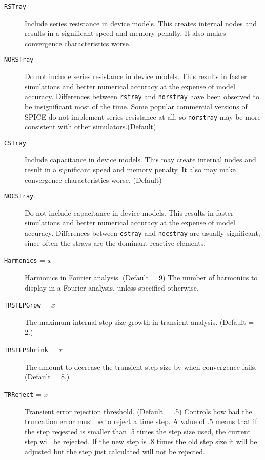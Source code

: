 \begin{description}
\item[{\tt RSTray}] Include series resistance in device models.  This 
creates internal nodes and results in a significant speed and memory 
penalty.  It also makes convergence characteristics worse.

\item[{\tt NORSTray}] Do not include series resistance in device
models.  This results in faster simulations and better numerical
accuracy at the expense of model accuracy.  Differences between
{\tt rstray} and {\tt norstray} have been observed to be insignificant
most of the time.  Some popular commercial versions of SPICE do
not implement series resistance at all, so {\tt norstray} may be
more consistent with other simulators.(Default)

\item[{\tt CSTray}] Include capacitance in device models.  This may
create internal nodes and result in a significant speed and memory 
penalty.  It also may make convergence characteristics worse.  (Default)

\item[{\tt NOCSTray}] Do not include capacitance in device models.
This results in faster simulations and better numerical accuracy
at the expense of model accuracy.  Differences between {\tt cstray}
and {\tt nocstray} are usually significant, since often the strays
are the dominant reactive elements.

\item[{\tt Harmonics} = {\it x}] Harmonics in Fourier analysis.
(Default = 9) The number of harmonics to display in a Fourier
analysis, unless specified otherwise.

\item[{\tt TRSTEPGrow} = {\it x}] The maximum internal step size
growth in transient analysis.  (Default = 2.)

\item[{\tt TRSTEPShrink} = {\it x}] The amount to decrease the
transient step size by when convergence fails.  (Default = 8.)

\item[{\tt TRReject} = {\it x}] Transient error rejection threshold.
(Default = .5)  Controls how bad the truncation error must be to
reject a time step.  A value of .5 means that if the step reqested
is smaller than .5 times the step size used, the current step will
be rejected.  If the new step is .8 times the old step size it will
be adjusted but the step just calculated will not be rejected.

\end{description}
